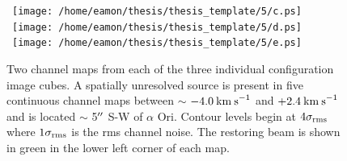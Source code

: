 \begin{figure}[htp]
\mbox{
          \texttt{[image: /home/eamon/thesis/thesis\_template/5/c.ps]}
          }
\mbox{
          \texttt{[image: /home/eamon/thesis/thesis\_template/5/d.ps]}
          }
\mbox{
          \texttt{[image: /home/eamon/thesis/thesis\_template/5/e.ps]}
          }          
\caption[Discrete sources in individual configuration image cubes]{Two channel maps from each of the three individual configuration image cubes. A spatially unresolved source is present in five continuous channel maps between $\sim$ $-4.0\>{\rm km\>s}^{-1}$ and $+2.4\>{\rm km\>s}^{-1}$ and is located $\sim$ 5$^{\prime\prime}$ S-W of $\alpha$ Ori. Contour levels begin at $4\sigma _{\rm{rms}}$ where $1\sigma _{\rm{rms}}$ is the rms channel noise. The restoring beam is shown in green in the lower left corner of each map.}
\label{fig:5.6}
\end{figure}

